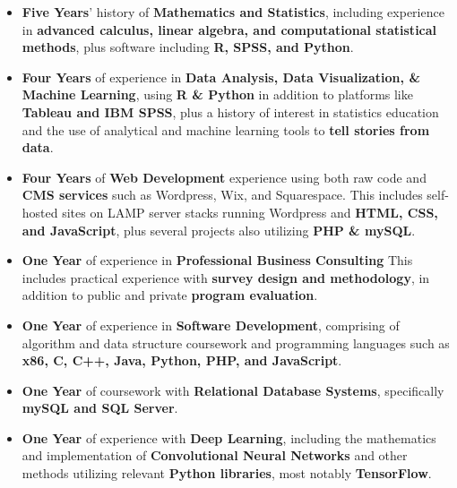 \documentclass[8pt,a4paper,ragged2e,withhyper]{altacv}
\begin{document}
\begin{changemargin}{0.5cm}{0.7cm}
\begin{itemize}
    
    \item \textbf{\color{accent}Five Years}' history of \textbf{\color{accent}Mathematics and Statistics}, including experience in \textbf{advanced calculus, linear algebra, and computational statistical methods}, plus software including \textbf{R, SPSS, and Python}.
    \item \textbf{\color{accent}Four Years} of experience in \textbf{\color{accent}Data Analysis, Data Visualization, \& Machine Learning}, using \textbf{R \& Python} in addition to platforms like \textbf{Tableau and IBM SPSS}, plus a history of interest in statistics education and the use of analytical and machine learning tools to \textbf{tell stories from data}.
    \item \textbf{\color{accent}Four Years} of \textbf{\color{accent}Web Development} experience using both raw code and \textbf{CMS services} such as Wordpress, Wix, and Squarespace. This includes self-hosted sites on LAMP server stacks running Wordpress and \textbf{HTML, CSS, and JavaScript}, plus several projects also utilizing \textbf{PHP \& mySQL}.

    \item \textbf{\color{accent}One Year} of experience in \textbf{\color{accent}Professional Business Consulting} This includes practical experience with \textbf{survey design and methodology}, in addition to public and private \textbf{program evaluation}.
    \item \textbf{\color{accent}One Year} of experience in \textbf{\color{accent}Software Development}, comprising of algorithm and data structure coursework and programming languages such as \textbf{x86, C, C++, Java, Python, PHP, and JavaScript}.
    \item \textbf{\color{accent}One Year} of coursework with \textbf{\color{accent}Relational Database Systems}, specifically \textbf{mySQL and SQL Server}.
    \item \textbf{\color{accent}One Year} of experience with \textbf{\color{accent}Deep Learning}, including the mathematics and implementation of \textbf{Convolutional Neural Networks} and other methods utilizing relevant \textbf{Python libraries}, most notably \textbf{TensorFlow}.
\end{itemize}


\end{changemargin}
\end{document}
